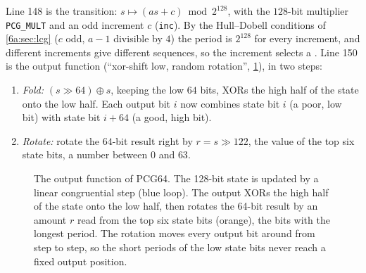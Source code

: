 Line 148 is the transition: $s\mapsto(as+c)\bmod2^{128}$, with the $128$-bit
multiplier \texttt{PCG\_MULT} and an odd increment $c$ (\texttt{inc}). By the
Hull--Dobell conditions of \cref{6a:sec:lcg} ($c$ odd, $a-1$ divisible by $4$) the
period is $2^{128}$ for every increment, and different increments give different
sequences, so the increment selects a . Line 150 is the
output function  (``xor-shift low, random rotation'', \cref{6a:fig:pcg-output}), in two steps:
\begin{enumerate}[itemsep=1pt]
  \item \emph{Fold:} $(s\gg64)\oplus s$, keeping the low $64$ bits, XORs the high
        half of the state onto the low half. Each output bit $i$ now combines state
        bit $i$ (a poor, low bit) with state bit $i+64$ (a good, high bit).
  \item \emph{Rotate:} rotate the $64$-bit result right by $r=s\gg122$, the value of
        the top six state bits, a number between $0$ and $63$.
\end{enumerate}
\begin{figure}[htbp]
\centering
{}
\caption{The output function of PCG64. The 128-bit state is updated by a linear
congruential step (blue loop). The output XORs the high half of the state onto
the low half, then rotates the 64-bit result by an amount $r$ read from the top six
state bits (orange), the bits with the longest period. The rotation moves every
output bit around from step to step, so the short periods of the low state bits
never reach a fixed output position.}
\label{6a:fig:pcg-output}
\end{figure}


